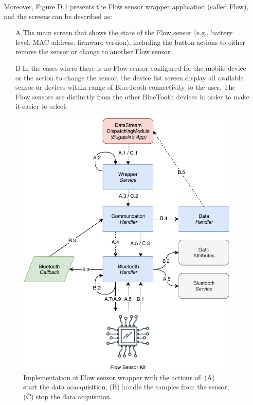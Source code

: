Moreover, Figure D.1 presents the Flow sensor wrapper application (called Flow), and the screens can be described as: 

\begin{itemize}
    \item[A] The main screen that shows the state of the Flow sensor (e.g., battery level, MAC address, firmware version), including the button actions to either remove the sensor or change to another Flow sensor. 
    \item[B] In the cases where there is no Flow sensor configured for the mobile device or the action to change the sensor, the device list screen display all available sensor or devices within range of BlueTooth connectivity to the user. The Flow sensors are distinctly from the other BlueTooth devices in order to make it easier to select.
\end{itemize}

\begin{figure}
    \centering
    \includegraphics[scale=0.7]{images/Flow_Imp.pdf}
    \caption{Implementation of Flow sensor wrapper with the actions of: (A) start the data acacquisition, (B) handle the samples from the sensor; (C) stop the data acquisition.}
    \label{fig:impl_flowsensor}
\end{figure}

